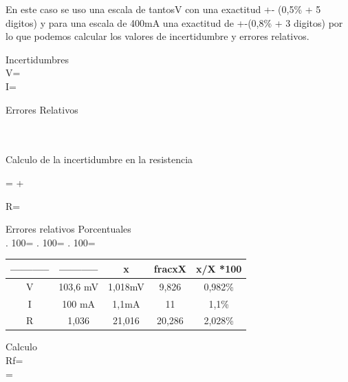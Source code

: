 \documentclass[12pt, letterpaper]{article}
\begin{document}
En este caso se uso una escala de tantosV con una exactitud +- (0,5\% + 5 digitos) y para una escala de 400mA una exactitud de +-(0,8\% + 3 digitos)
por lo que podemos calcular los valores de incertidumbre y errores relativos.
\\
\item  Incertidumbres\\
\Delta  V=\\
\Delta I=\\
\item Errores Relativos\\
\\
 \\
\item Calculo de la incertidumbre en la resistencia\newline

 = +  \newline

\Delta R=\newline

\item Errores relativos Porcentuales\\

 . 100=\newline
{} . 100=\newline
{} . 100=\newline
 
\begin{center}
	\begin{tabular}{|c|c|c|c|c|}
	\hline
	----------- & ----------- & \Delta x  & frac{\Delta x}{X}  & \Delta x/X *100 \\ \hline
	V           & 103,6 mV    & 1,018mV & 9,826      & 0,982\%        \\ \hline
	I           & 100 mA      & 1,1mA   & 11         & 1,1\%          \\ \hline
	R           & 1,036    \Omega    & 21,016 \Omega  & 20,286     & 2,028\%        \\ \hline
	\end{tabular}
	\end{center}

\singlespacing
\item Calculo\\ 

Rf= \\

= 
\singlespacing
\end{document}
